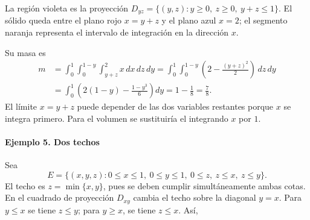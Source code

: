 La región violeta es la proyección $D_{yz}=\{(y,z):y\geq0,\ z\geq0,\ y+z\leq1\}$. El sólido queda entre el plano rojo $x=y+z$ y el plano azul $x=2$; el segmento naranja representa el intervalo de integración en la dirección $x$.

Su masa es
\begin{align*}
m&=\int_0^1\int_0^{1-y}\int_{y+z}^2 x\,dx\,dz\,dy
=\int_0^1\int_0^{1-y}\left(2-\frac{(y+z)^2}{2}\right)\,dz\,dy\\
&=\int_0^1\left(2(1-y)-\frac{1-y^3}{6}\right)dy
=1-\frac18=\frac78.
\end{align*}
El límite $x=y+z$ puede depender de las dos variables restantes porque $x$ se integra primero. Para el volumen se sustituiría el integrando $x$ por $1$.

\paragraph{Ejemplo 5. Dos techos}

Sea
\[
E=\{(x,y,z):0\leq x\leq1,\ 0\leq y\leq1,\
0\leq z,\ z\leq x,\ z\leq y\}.
\]
El techo es $z=\min\{x,y\}$, pues se deben cumplir simultáneamente ambas cotas. En el cuadrado de proyección $D_{xy}$ cambia el techo sobre la diagonal $y=x$. Para $y\leq x$ se tiene $z\leq y$; para $y\geq x$, se tiene $z\leq x$. Así,

